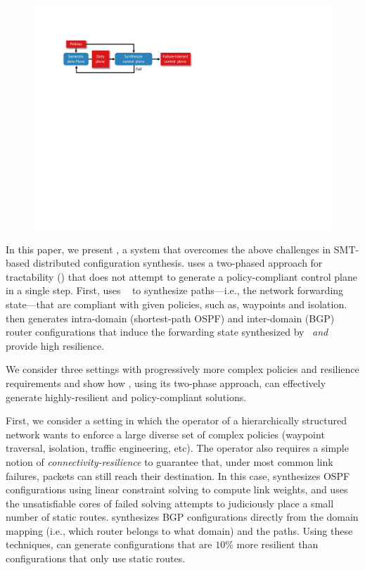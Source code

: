 \begin{figure}
	\includegraphics[width=\columnwidth]{figures/architecture.pdf}
	\label{fig:architecture}
\end{figure}

In this paper, we present \name, a system that overcomes the above
challenges in SMT-based distributed configuration synthesis.  \name
uses a two-phased approach for tractability ()
that does not attempt to generate a policy-compliant control plane in
a single step.  First, \name uses \genesis~\cite{genesis} to
synthesize paths---i.e., the network forwarding state---that are
compliant with given policies, such as, waypoints and isolation.
\name then generates intra-domain (shortest-path OSPF) and
inter-domain (BGP) router configurations that induce the forwarding
state synthesized by \genesis\ {\em and} provide high resilience.

We consider three settings with progressively more complex policies
and resilience requirements and show how \name, using its two-phase
approach, can effectively generate highly-resilient and
policy-compliant solutions.

First, we consider a setting in which the operator of a hierarchically
structured network wants to enforce a large diverse set of complex
policies (waypoint traversal, isolation, traffic engineering, etc).
The operator also requires a simple notion of
\emph{connectivity-resilience} to guarantee that, under most common
link failures, packets can still reach their destination.  In this
case, \name synthesizes OSPF configurations using linear constraint
solving to compute link weights, and uses the unsatisfiable cores of
failed solving attempts to judiciously place a small number of static
routes.  \name synthesizes BGP configurations directly from the domain
mapping (i.e., which router belongs to what domain) and the paths.
Using these techniques, \name can generate configurations that are
$10\%$ more resilient than configurations that only use static routes.

